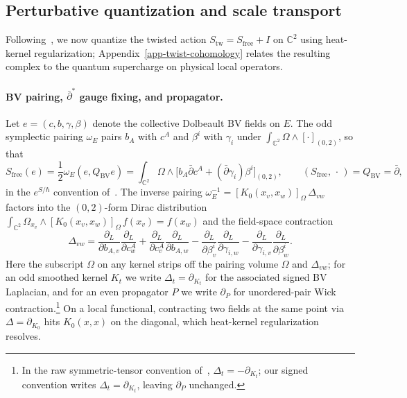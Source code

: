 \documentclass[11pt]{article}
\numberwithin{equation}{section}
\numberwithin{figure}{section}
\numberwithin{table}{section}
\begin{document}
\subsection{Perturbative quantization and scale transport}\label{sec-brackets}\label{sec-setup}

Following~\cite{Costello,CostelloBV,Wang,semichiral,operatope,higher,BK}, we now quantize the twisted action $S_{\mathrm{tw}}=S_{\mathrm{free}}+I$ on $\mathbb C^2$ using heat-kernel regularization; Appendix~\ref{app-twist-cohomology} relates the resulting complex to the quantum supercharge on physical local operators.

\paragraph{BV pairing, $\bar\partial^*$ gauge fixing, and propagator.}
Let $e=(c,b,\gamma,\beta)$ denote the collective Dolbeault BV fields on $E$. The odd symplectic pairing $\omega_E$ pairs $b_A$ with $c^A$ and $\beta^i$ with $\gamma_i$ under $\int_{\mathbb C^2}\Omega\wedge[\cdot]_{(0,2)}$, so that
\begin{equation}\label{eq-C-quadratic-action}
S_{\mathrm{free}}(e)
=\frac12\omega_E(e,Q_{\mathrm{BV}}e)
=\int_{\mathbb C^2}\Omega\wedge
\bigl[b_A\bar\partial c^A
+(\bar\partial\gamma_i)\beta^i\bigr]_{(0,2)},
\qquad (S_{\mathrm{free}},\,\cdot\,)=Q_{\mathrm{BV}}=\bar\partial,
\end{equation}
in the $e^{S/\hbar}$ convention of~\cite{CostelloBV}. The inverse pairing $\omega_E^{-1}=[K_0(x_v,x_w)]_\Omega\,\Delta_{vw}$ factors into the $(0,2)$-form Dirac distribution $\int_{\mathbb C^2}\Omega_{x_v}\wedge[K_0(x_v,x_w)]_\Omega\,f(x_v)=f(x_w)$ and the field-space contraction
\begin{equation}\label{eq-A-20}
\Delta_{vw}=
\frac{\partial_L}{\partial b_{A,v}}
\frac{\partial_L}{\partial c_w^A}
+\frac{\partial_L}{\partial c_v^A}
\frac{\partial_L}{\partial b_{A,w}}
-\frac{\partial_L}{\partial\beta_v^i}
\frac{\partial_L}{\partial\gamma_{i,w}}
-\frac{\partial_L}{\partial\gamma_{i,v}}
\frac{\partial_L}{\partial\beta_w^i}.
\end{equation}
Here the subscript $\Omega$ on any kernel strips off the pairing volume $\Omega$ and $\Delta_{vw}$; for an odd smoothed kernel $K_t$ we write $\Delta_t=\partial_{K_t}$ for the associated signed BV Laplacian, and for an even propagator $P$ we write $\partial_P$ for unordered-pair Wick contraction.\footnote{In the raw symmetric-tensor convention of~\cite[Sections 6.4 and 10]{CostelloBV}, $\Delta_t=-\partial_{K_t}$; our signed convention writes $\Delta_t=\partial_{K_t}$, leaving $\partial_P$ unchanged.} On a local functional, contracting two fields at the same point via $\Delta=\partial_{K_0}$ hits $K_0(x,x)$ on the diagonal, which heat-kernel regularization resolves.
\end{document}
